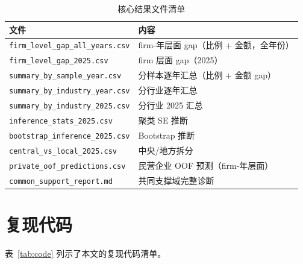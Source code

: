 \documentclass[11pt,a4paper]{ctexart}
\begin{document}
\begin{table}[htbp]
\centering
\caption{核心结果文件清单}
\label{tab:files}
\begin{threeparttable}
\small
\begin{tabular}{ll}
\toprule
文件 & 内容 \\
\midrule
\texttt{firm\_level\_gap\_all\_years.csv} & firm-年层面 gap（比例 + 金额，全年份） \\
\texttt{firm\_level\_gap\_2025.csv} & firm 层面 gap（2025） \\
\texttt{summary\_by\_sample\_year.csv} & 分样本逐年汇总（比例 + 金额 gap） \\
\texttt{summary\_by\_industry\_year.csv} & 分行业逐年汇总 \\
\texttt{summary\_by\_industry\_2025.csv} & 分行业 2025 汇总 \\
\texttt{inference\_stats\_2025.csv} & 聚类 SE 推断 \\
\texttt{bootstrap\_inference\_2025.csv} & Bootstrap 推断 \\
\texttt{central\_vs\_local\_2025.csv} & 中央/地方拆分 \\
\texttt{private\_oof\_predictions.csv} & 民营企业 OOF 预测（firm-年层面） \\
\texttt{common\_support\_report.md} & 共同支撑域完整诊断 \\
\bottomrule
\end{tabular}
\end{threeparttable}
\end{table}

\section{复现代码}

表~\ref{tab:code} 列示了本文的复现代码清单。
\end{document}
